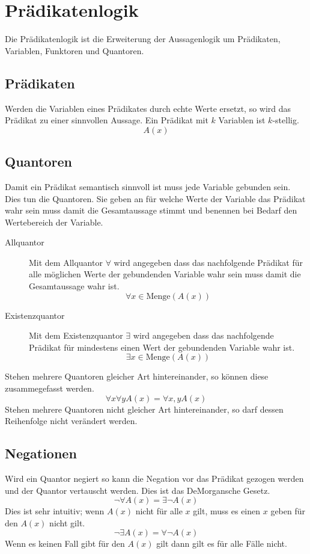 \documentclass{article}
\begin{document}
\section{Prädikatenlogik} 
Die Prädikatenlogik ist die Erweiterung der Aussagenlogik um Prädikaten, Variablen, Funktoren und Quantoren.

\subsection{Prädikaten}
Werden die Variablen eines Prädikates durch echte Werte ersetzt, so wird das Prädikat zu einer sinnvollen Aussage. Ein Prädikat mit $k$ Variablen ist $k$-stellig.
\[
 A(x)
\]

\subsection{Quantoren}
Damit ein Prädikat semantisch sinnvoll ist muss jede Variable gebunden sein. Dies tun die Quantoren. Sie geben an für welche Werte der Variable das Prädikat wahr sein muss damit die Gesamtaussage stimmt und benennen bei Bedarf den Wertebereich der Variable.
\begin{description}
 \item[Allquantor] Mit dem Allquantor $\forall$ wird angegeben dass das nachfolgende Prädikat für alle möglichen Werte der gebundenden Variable wahr sein muss damit die Gesamtaussage wahr ist.
\[
 \forall x \in \text{Menge} (A(x))
\]
 \item[Existenzquantor] Mit dem Existenzquantor $\exists$ wird angegeben dass das nachfolgende Prädikat für mindestens einen Wert der gebundenden Variable wahr ist.
\[
 \exists x \in \text{Menge} (A(x))
\]
\end{description}
Stehen mehrere Quantoren gleicher Art hintereinander, so können diese zusammegefasst werden.
\[
 \forall x \forall y A(x) =
 \forall x, y A(x)
\]
Stehen mehrere Quantoren nicht gleicher Art hintereinander, so darf dessen Reihenfolge nicht verändert werden.

\subsection{Negationen}
Wird ein Quantor negiert so kann die Negation vor das Prädikat gezogen werden und der Quantor vertauscht werden. Dies ist das DeMorgansche Gesetz.
\[
 \lnot \forall A(x) = \exists \lnot A(x)
\]
Dies ist sehr intuitiv; wenn $A(x)$ nicht für alle $x$ gilt, muss es einen $x$ geben für den $A(x)$ nicht gilt.
\[
 \lnot \exists A(x) = \forall \lnot A(x)
\]
Wenn es keinen Fall gibt für den $A(x)$ gilt dann gilt es für alle Fälle nicht.
\end{document}
